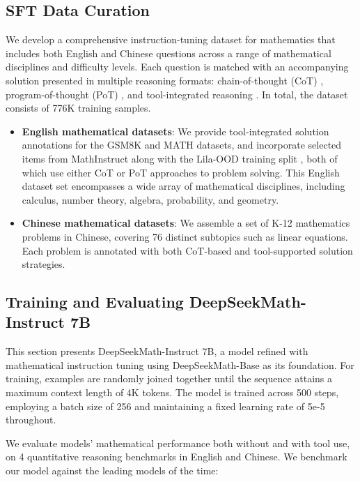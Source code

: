\begin{itemize}[topsep=0pt]
\subsection{SFT Data Curation}

We develop a comprehensive instruction-tuning dataset for mathematics that includes both English and Chinese questions across a range of mathematical disciplines and difficulty levels. Each question is matched with an accompanying solution presented in multiple reasoning formats: chain-of-thought (CoT) \citep{cot}, program-of-thought (PoT) \citep{pot,pal}, and tool-integrated reasoning \citep{tora}. In total, the dataset consists of 776K training samples.

\begin{itemize}[topsep=0pt]
    \item \textbf{English mathematical datasets}: We provide tool-integrated solution annotations for the GSM8K and MATH datasets, and incorporate selected items from MathInstruct \citep{MathInstruct} along with the Lila-OOD training split \citep{lila}, both of which use either CoT or PoT approaches to problem solving. This English dataset set encompasses a wide array of mathematical disciplines, including calculus, number theory, algebra, probability, and geometry.
    \item \textbf{Chinese mathematical datasets}: We assemble a set of K-12 mathematics problems in Chinese, covering 76 distinct subtopics such as linear equations. Each problem is annotated with both CoT-based and tool-supported solution strategies.
\end{itemize}

\subsection{Training and Evaluating DeepSeekMath-Instruct 7B}

This section presents DeepSeekMath-Instruct 7B, a model refined with mathematical instruction tuning using DeepSeekMath-Base as its foundation. For training, examples are randomly joined together until the sequence attains a maximum context length of 4K tokens. The model is trained across 500 steps, employing a batch size of 256 and maintaining a fixed learning rate of 5e-5 throughout.

We evaluate models' mathematical performance both without and with tool use, on 4 quantitative reasoning benchmarks in English and Chinese. We benchmark our model against the leading models of the time:


\end{itemize}
